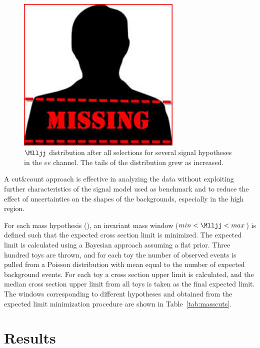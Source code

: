 \begin{figure}[h]
	\centering
	\includegraphics[width=0.7\textwidth]{figures/missingImage.png}
	\caption{$\Mlljj$ distribution after all selections for several \WR signal hypotheses in the $ee$ channel.  The 
	tails of the distribution grew as \mWR increased.}
	\label{fig:signalShapesAfterSelection}
\end{figure}




A cut\&count approach is effective in analyzing the data without exploiting further characteristics of the signal model used as benchmark and to reduce the effect of uncertainties on the shapes of the backgrounds, especially in the high \Mlljj region.


For each \WR mass hypothesis (\MWR), an invariant mass window ($ min < \Mlljj < max$) is defined such that the expected \WR cross section limit is minimized.
The expected limit is calculated using a Bayesian approach assuming a flat prior.  Three hundred toys are thrown, and for each toy the number of observed
events is pulled from a Poisson distribution with mean equal to the number of expected background events.  For each toy a \WR cross section upper limit is calculated, and the
median cross section upper limit from all toys is taken as the final expected limit.
The \Mlljj windows corresponding to different \MWR hypotheses and obtained from the expected limit minimization procedure are shown in Table~\ref{tab:masscuts}.




\section{Results}
\label{sec:searchResults}

